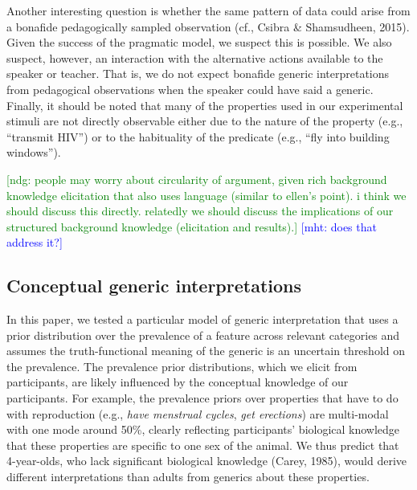 \documentclass[floatsintext,doc]{apa6}
\begin{document}
Another interesting question is whether the same pattern of data could arise from a bonafide pedagogically sampled observation (cf., Csibra \& Shamsudheen, 2015).
Given the success of the pragmatic model, we suspect this is possible.
We also suspect, however, an interaction with the alternative actions available to the speaker or teacher.
That is, we do not expect bonafide generic interpretations from pedagogical observations when the speaker could have said a generic.
Finally, it should be noted that many of the properties used in our experimental stimuli are not directly observable either due to the nature of the property (e.g., \enquote{transmit HIV}) or to the habituality of the predicate (e.g., \enquote{fly into building windows}).

{\textcolor{Green}{[ndg: people may worry about circularity of argument, given rich background knowledge elicitation that also uses language (similar to ellen's point). i think we should discuss this directly. relatedly we should discuss the implications of our structured background knowledge (elicitation and results).]}}
{\textcolor{Blue}{[mht: does that address it?]}}

\hypertarget{conceptual-generic-interpretations}{%
\subsection{Conceptual generic interpretations}\label{conceptual-generic-interpretations}}

In this paper, we tested a particular model of generic interpretation that uses a prior distribution over the prevalence of a feature across relevant categories and assumes the truth-functional meaning of the generic is an uncertain threshold on the prevalence.
The prevalence prior distributions, which we elicit from participants, are likely influenced by the conceptual knowledge of our participants.
For example, the prevalence priors over properties that have to do with reproduction (e.g., \emph{have menstrual cycles}, \emph{get erections}) are multi-modal with one mode around 50\%, clearly reflecting participants' biological knowledge that these properties are specific to one sex of the animal.
We thus predict that 4-year-olds, who lack significant biological knowledge (Carey, 1985), would derive different interpretations than adults from generics about these properties.
\end{document}
